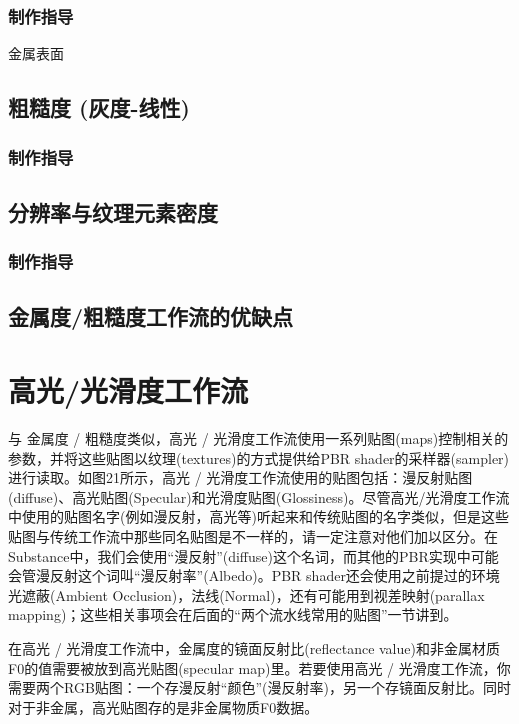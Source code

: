 \subsubsection{制作指导}

金属表面

\subsection{粗糙度 (灰度-线性)}

\subsubsection{制作指导}

\subsection{分辨率与纹理元素密度}

\subsubsection{制作指导}

\subsection{金属度/粗糙度工作流的优缺点}

\section{高光/光滑度工作流}

与 金属度 / 粗糙度类似，高光 / 光滑度工作流使用一系列贴图(maps)控制相关的参数，并将这些贴图以纹理(textures)的方式提供给PBR shader的采样器(sampler)进行读取。如图21所示，高光 / 光滑度工作流使用的贴图包括：漫反射贴图(diffuse)、高光贴图(Specular)和光滑度贴图(Glossiness)。尽管高光/光滑度工作流中使用的贴图名字(例如漫反射，高光等)听起来和传统贴图的名字类似，但是这些贴图与传统工作流中那些同名贴图是不一样的，请一定注意对他们加以区分。在Substance中，我们会使用“漫反射”(diffuse)这个名词，而其他的PBR实现中可能会管漫反射这个词叫“漫反射率”(Albedo)。PBR shader还会使用之前提过的环境光遮蔽(Ambient Occlusion)，法线(Normal)，还有可能用到视差映射(parallax mapping)；这些相关事项会在后面的“两个流水线常用的贴图”一节讲到。

在高光 / 光滑度工作流中，金属度的镜面反射比(reflectance value)和非金属材质F0的值需要被放到高光贴图(specular map)里。若要使用高光 / 光滑度工作流，你需要两个RGB贴图：一个存漫反射“颜色”(漫反射率)，另一个存镜面反射比。同时对于非金属，高光贴图存的是非金属物质F0数据。

